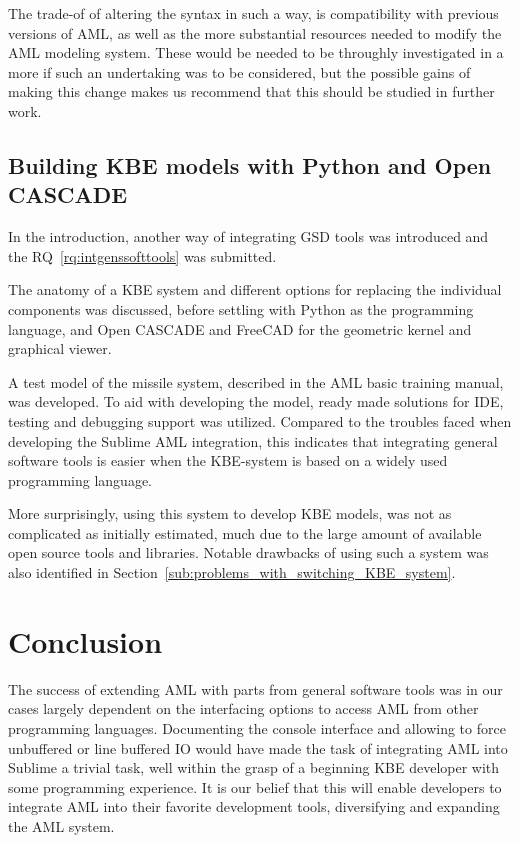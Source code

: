 The trade-of of altering the syntax in such a way, is compatibility with previous versions of AML, as well as the more substantial resources needed to modify the AML modeling system. These would be needed to be throughly investigated in a more if such an undertaking was to be considered, but the possible gains of making this change makes us recommend that this should be studied in further work.

\subsection{Building KBE models with Python and Open CASCADE} %
\label{sub:building_kbe_models_with_python_and_open_cascade}
In the introduction, another way of integrating GSD tools was introduced and the RQ~\ref{rq:intgenssofttools} was submitted.

The anatomy of a KBE system and different options for replacing the individual components was discussed, before settling with Python as the programming language, and Open CASCADE and FreeCAD for the geometric kernel and graphical viewer.

A test model of the missile system, described in the AML basic training manual, was developed. To aid with developing the model, ready made solutions for IDE, testing and debugging support was utilized. Compared to the troubles faced when developing the Sublime AML integration, this indicates that integrating general software tools is easier when the KBE-system is based on a widely used programming language.

More surprisingly, using this system to develop KBE models, was not as complicated as initially estimated, much due to the large amount of available open source tools and libraries. Notable drawbacks of using such a system was also identified in Section~\ref{sub:problems_with_switching_KBE_system}.


\section{Conclusion} %
\label{sec:conclusion}
The success of extending AML with parts from general software tools was in our cases largely dependent on the interfacing options to access AML from other programming languages. Documenting the console interface and allowing to force unbuffered or line buffered IO would have made the task of integrating AML into Sublime a trivial task, well within the grasp of a beginning KBE developer with some programming experience. It is our belief that this will enable developers to integrate AML into their favorite development tools, diversifying and expanding the AML system.

